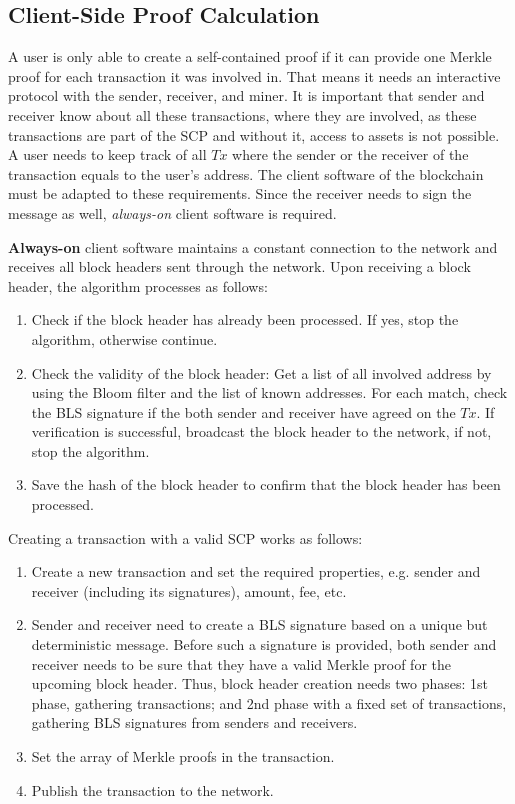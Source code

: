 \documentclass[conference]{IEEEtran}
\begin{document}
\subsection{Client-Side Proof Calculation}
A user is only able to create a self-contained proof if it can provide one Merkle proof for each transaction it was involved in. That means it needs an interactive protocol with the sender, receiver, and miner. It is important that sender and receiver know about all these transactions, where they are involved, as these transactions are part of the SCP and without it, access to assets is not possible. A user needs to keep track of all $Tx$ where the sender or the receiver of the transaction equals to the user's address. The client software of the blockchain must be adapted to these requirements. Since the receiver needs to sign the message as well, \textit{always-on} client software is required.

\textbf{Always-on} client software maintains a constant connection to the network and receives all block headers sent through the network. Upon receiving a block header, the algorithm processes as follows:
\begin{enumerate}
 \item Check if the block header has already been processed. If yes, stop the algorithm, otherwise continue.
 \item Check the validity of the block header: Get a list of all involved address by using the Bloom filter and the list of known addresses. For each match, check the BLS signature if the both sender and receiver have agreed on the $Tx$. If verification is successful, broadcast the block header to the network, if not, stop the algorithm.
 \item Save the hash of the block header to confirm that the block header has been processed.
\end{enumerate}
Creating a transaction with a valid SCP works as follows:
\begin{enumerate}
 \item Create a new transaction and set the required properties, e.g. sender and receiver (including its signatures), amount, fee, etc.
 \item Sender and receiver need to create a BLS signature based on a unique but deterministic message. Before such a signature is provided, both sender and receiver needs to be sure that they have a valid Merkle proof for the upcoming block header. Thus, block header creation needs two phases: 1st phase, gathering transactions; and 2nd phase with a fixed set of transactions, gathering BLS signatures from senders and receivers.
 \item Set the array of Merkle proofs in the transaction.
 \item Publish the transaction to the network.
\end{enumerate}
\end{document}
